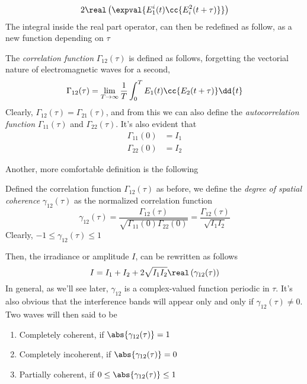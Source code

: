 \documentclass[../electromagnetism.tex]{subfiles}
\begin{document}
\begin{equation}
	2\real\left( \expval{E_1^i(t)\cc{E_i^2(t+\tau)}} \right)
	\label{eq:interferencetermtau}
\end{equation}
The integral inside the real part operator, can then be redefined as follow, as a new function depending on $\tau$
\begin{dfn}
	The \emph{correlation function } $\Gamma_{12}(\tau)$ is defined as follows, forgetting the vectorial nature of electromagnetic waves for a second,
	\begin{equation}
		\Gamma_{12}(\tau)=\lim_{T\to\infty}\frac{1}{T}\int_{0}^{T}E_1(t)\cc{E_2(t+\tau)}\dd{t}
		\label{eq:correlationfunction}
	\end{equation}
	Clearly, $\Gamma_{12}(\tau)=\Gamma_{21}(\tau)$, and from this we can also define the \emph{autocorrelation function} $\Gamma_{11}(\tau)$ and $\Gamma_{22}(\tau)$. It's also evident that
	\begin{equation}
		\begin{aligned}
			\Gamma_{11}(0)&= I_1\\
			\Gamma_{22}(0)&= I_2
		\end{aligned}
		\label{eq:autocorrelationzero}
	\end{equation}
\end{dfn}
Another, more comfortable definition is the following
\begin{dfn}
	Defined the correlation function $\Gamma_{12}(\tau)$ as before, we define the \emph{degree of spatial coherence} $\gamma_{12}(\tau)$ as the normalized correlation function
	\begin{equation}
		\gamma_{12}(\tau)=\frac{\Gamma_{12}(\tau)}{\sqrt{\Gamma_{11}(0)\Gamma_{22}(0)}}=\frac{\Gamma_{12}(\tau)}{\sqrt{I_1I_2}}
		\label{eq:degreespatialcoherencedfn}
	\end{equation}
	Clearly, $-1\le\gamma_{12}(\tau)\le1$
\end{dfn}
Then, the irradiance or amplitude $I$, can be rewritten as follows
\begin{equation}
	I=I_1+I_2+2\sqrt{I_1I_2}\real\left( \gamma_{12}(\tau) \right)
	\label{eq:irradiancegamma12}
\end{equation}
In general, as we'll see later, $\gamma_{12}$ is a complex-valued function periodic in $\tau$. It's also obvious that the interference bands will appear only and only if $\gamma_{12}(\tau)\ne0$.\\
Two waves will then said to be
\begin{enumerate}
\item Completely coherent, if $\abs{\gamma_{12}(\tau)}=1$
\item Completely incoherent, if $\abs{\gamma_{12}(\tau)}=0$
\item Partially coherent, if $0\le\abs{\gamma_{12}(\tau)}\le1$
\end{enumerate}
\end{document}
